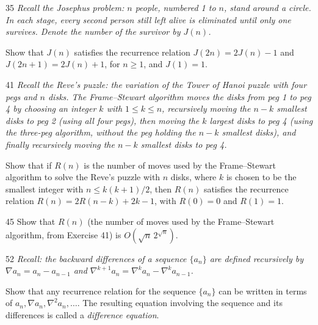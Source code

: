 \documentclass[11pt]{article}
\begin{document}
\begin{exercise}{35}
    \textit{Recall the Josephus problem: $n$ people, numbered 1 to
    $n$, stand around a circle. In each stage, every second person
    still left alive is eliminated until only one survives. Denote
    the number of the survivor by $J(n)$.}

    Show that $J(n)$ satisfies the recurrence relation
    $J(2n) = 2J(n) - 1$ and $J(2n+1) = 2J(n) + 1$, for $n \geq 1$, and
    $J(1) = 1$.
\end{exercise}

\begin{exercise}{41}
    \textit{Recall the Reve's puzzle: the variation of the Tower of
    Hanoi puzzle with four pegs and $n$ disks. The Frame--Stewart
    algorithm moves the disks from peg 1 to peg 4 by choosing an
    integer $k$ with $1 \leq k \leq n$, recursively moving the $n-k$
    smallest disks to peg 2 (using all four pegs), then moving the
    $k$ largest disks to peg 4 (using the three-peg algorithm, without
    the peg holding the $n-k$ smallest disks), and finally recursively
    moving the $n-k$ smallest disks to peg 4.}

    Show that if $R(n)$ is the number of moves used by the
    Frame--Stewart algorithm to solve the Reve's puzzle with $n$
    disks, where $k$ is chosen to be the smallest integer with
    $n \leq k(k+1)/2$, then $R(n)$ satisfies the recurrence relation
    $R(n) = 2R(n-k) + 2k - 1$, with $R(0) = 0$ and $R(1) = 1$.
\end{exercise}

\begin{exercise}{45}
    Show that $R(n)$ (the number of moves used by the Frame--Stewart
    algorithm, from Exercise 41) is $O(\sqrt{n}\, 2^{\sqrt{n}})$.
\end{exercise}

\begin{exercise}{52}
    \textit{Recall: the backward differences of a sequence $\{a_n\}$
    are defined recursively by $\nabla a_n = a_n - a_{n-1}$ and
    $\nabla^{k+1} a_n = \nabla^k a_n - \nabla^k a_{n-1}$.}

    Show that any recurrence relation for the sequence $\{a_n\}$ can
    be written in terms of $a_n, \nabla a_n, \nabla^2 a_n, \dots$. The
    resulting equation involving the sequence and its differences is
    called a \emph{difference equation}.
\end{exercise}
\end{document}
